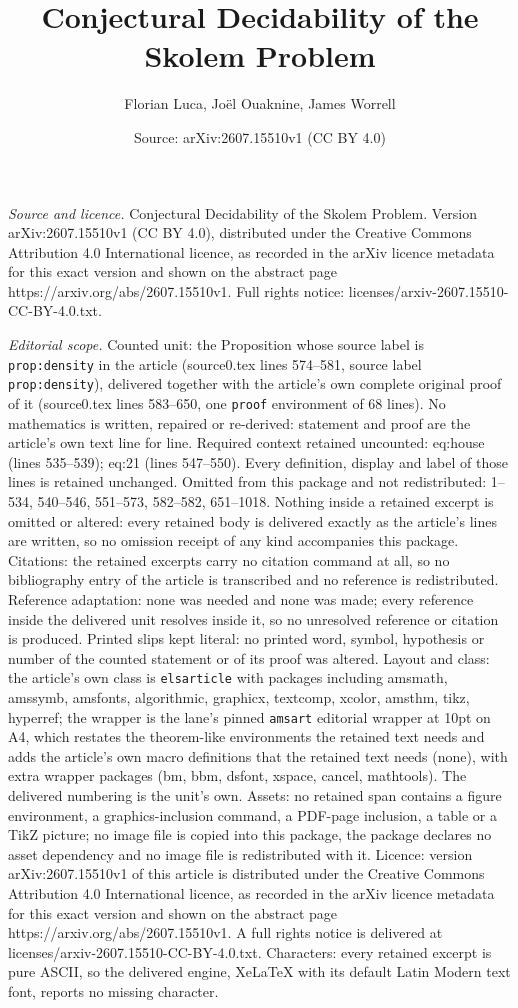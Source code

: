 \documentclass[10pt,a4paper]{amsart}
\title[Conjectural Decidability of the Skolem Problem]{Conjectural Decidability of the Skolem Problem}
\author{Florian Luca, Jo\"el Ouaknine, James Worrell}
\date{Source: arXiv:2607.15510v1 (CC BY 4.0)}
\begin{document}
\maketitle

\noindent\emph{Source and licence.} Conjectural Decidability of the Skolem Problem. Version arXiv:2607.15510v1 (CC BY 4.0), distributed under the Creative Commons Attribution 4.0 International licence, as recorded in the arXiv licence metadata for this exact version and shown on the abstract page https://arxiv.org/abs/2607.15510v1. Full rights notice: licenses/arxiv-2607.15510-CC-BY-4.0.txt.\par\smallskip

\noindent\textit{Editorial scope.} Counted unit: the Proposition whose source label is \texttt{prop:density} in the article (source0.tex lines 574--581, source label \texttt{prop:density}), delivered together with the article's own complete original proof of it (source0.tex lines 583--650, one \texttt{proof} environment of 68 lines). No mathematics is written, repaired or re-derived: statement and proof are the article's own text line for line. Required context retained uncounted: eq:house (lines 535--539); eq:21 (lines 547--550). Every definition, display and label of those lines is retained unchanged. Omitted from this package and not redistributed: 1--534, 540--546, 551--573, 582--582, 651--1018. Nothing inside a retained excerpt is omitted or altered: every retained body is delivered exactly as the article's lines are written, so no omission receipt of any kind accompanies this package. Citations: the retained excerpts carry no citation command at all, so no bibliography entry of the article is transcribed and no reference is redistributed. Reference adaptation: none was needed and none was made; every reference inside the delivered unit resolves inside it, so no unresolved reference or citation is produced. Printed slips kept literal: no printed word, symbol, hypothesis or number of the counted statement or of its proof was altered. Layout and class: the article's own class is \texttt{elsarticle} with packages including amsmath, amssymb, amsfonts, algorithmic, graphicx, textcomp, xcolor, amsthm, tikz, hyperref; the wrapper is the lane's pinned \texttt{amsart} editorial wrapper at 10pt on A4, which restates the theorem-like environments the retained text needs and adds the article's own macro definitions that the retained text needs (none), with extra wrapper packages (bm, bbm, dsfont, xspace, cancel, mathtools). The delivered numbering is the unit's own. Assets: no retained span contains a figure environment, a graphics-inclusion command, a PDF-page inclusion, a table or a TikZ picture; no image file is copied into this package, the package declares no asset dependency and no image file is redistributed with it. Licence: version arXiv:2607.15510v1 of this article is distributed under the Creative Commons Attribution 4.0 International licence, as recorded in the arXiv licence metadata for this exact version and shown on the abstract page https://arxiv.org/abs/2607.15510v1. A full rights notice is delivered at licenses/arxiv-2607.15510-CC-BY-4.0.txt. Characters: every retained excerpt is pure ASCII, so the delivered engine, XeLaTeX with its default Latin Modern text font, reports no missing character.
\end{document}
